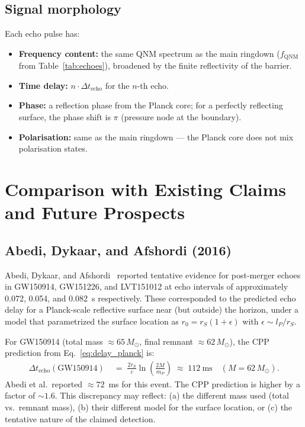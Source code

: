 \documentclass[12pt]{article}
\newcommand{\lP}{l_P}
\newcommand{\mP}{m_P}
\newcommand{\rS}{r_S}
\newcommand{\Dt}{\Delta t_{\mathrm{echo}}}
\begin{document}
\subsection{Signal morphology}

Each echo pulse has:
\begin{itemize}[noitemsep]
  \item \textbf{Frequency content:} the same QNM spectrum as the main
    ringdown ($f_{\mathrm{QNM}}$ from Table~\ref{tab:echoes}), broadened
    by the finite reflectivity of the barrier.
  \item \textbf{Time delay:} $n\cdot\Dt$ for the $n$-th echo.
  \item \textbf{Phase:} a reflection phase from the Planck core;
    for a perfectly reflecting surface, the phase shift is $\pi$
    (pressure node at the boundary).
  \item \textbf{Polarisation:} same as the main ringdown — the Planck
    core does not mix polarisation states.
\end{itemize}

\section{Comparison with Existing Claims and Future Prospects}
\label{sec:comparison}

\subsection{Abedi, Dykaar, and Afshordi (2016)}

Abedi, Dykaar, and Afshordi~\cite{abedi2016} reported tentative evidence
for post-merger echoes in GW150914, GW151226, and LVT151012 at echo
intervals of approximately 0.072, 0.054, and 0.082~s respectively.  These
corresponded to the predicted echo delay for a Planck-scale reflective
surface near (but outside) the horizon, under a model that parametrized
the surface location as $r_0 = \rS(1 + \epsilon)$ with $\epsilon \sim
\lP/\rS$.

For GW150914 (total mass $\approx\!65\,M_\odot$, final remnant
$\approx\!62\,M_\odot$), the CPP prediction from
Eq.~\eqref{eq:delay_planck} is:
\begin{align}
  \Dt(\text{GW150914})
  &\;=\; \frac{2\rS}{c}\ln\!\left(\frac{2M}{\mP}\right)
  \;\approx\; 112\ \mathrm{ms} \quad (M = 62\,M_\odot).
  \label{eq:gw150914}
\end{align}
Abedi et al.\ reported $\approx\!72$~ms for this event.  The CPP
prediction is higher by a factor of $\sim\!1.6$.  This discrepancy
may reflect: (a) the different mass used (total vs.\ remnant mass),
(b) their different model for the surface location, or (c) the
tentative nature of the claimed detection.
\end{document}
